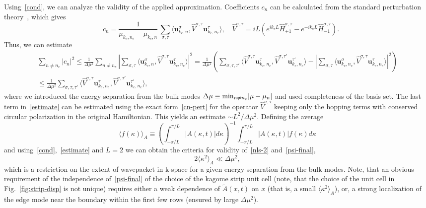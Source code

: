 \documentclass[
aps,
prl,
groupedaddress,
superscriptaddress,
floatfix,
notitlepage
]{revtex4-1}
\begin{document}
Using~\eqref{cond}, we can analyze the validity of the applied approximation. 
Coefficients $c_n$ can be calculated from the standard perturbation theory~\cite{LL-III}, which gives
\begin{equation}
\quad
c_n = \frac{1}{\mu_{k_e,n_e}-\mu_{k_e,n}}\,
\sum_{\sigma,\tau} \langle \pmb{u}^{\sigma}_{k_e,n}, \hat{V}^{\sigma,\tau}
\pmb{u}^{\tau}_{k_e,n_e}
\rangle,
\quad
\hat{V}^{\sigma,\tau} = iL \left(e^{ik_eL} \hat H_{+1}^{\sigma,\tau} - e^{-ik_eL} \hat H_{-1}^{\sigma,\tau}\right).
\label{cn-pert}
\end{equation}
Thus, we can estimate
\begin{multline}
\sum_{n\neq n_e}|c_n|^2 \le \frac{1}{\Delta\mu^2} 
\sum_{n\neq n_e} 
\left|\sum_{\sigma,\tau} \langle \pmb{u}^{\sigma}_{k_e,n}, \hat{V}^{\sigma,\tau}\pmb{u}^{\tau}_{k_e,n_e} \rangle\right|^2
=
\frac{1}{\Delta\mu^2} \left(
\sum_{\sigma,\tau,\tau'} 
\langle \hat{V}^{\sigma,\tau}\pmb{u}^{\tau}_{k_e,n_e} , \hat{V}^{\sigma,\tau'}\pmb{u}^{\tau'}_{k_e,n_e}\rangle
- \left| \sum_{\sigma,\tau} \langle \pmb{u}^{\sigma}_{k_e,n_e}, \hat{V}^{\sigma,\tau}\pmb{u}^{\tau}_{k_e,n_e} \rangle \right|^2
\right) 
\\
\le \frac{1}{\Delta\mu^2}
\sum_{\sigma,\tau,\tau'} 
\langle \hat{V}^{\sigma,\tau}\pmb{u}^{\tau}_{k_e,n_e} , \hat{V}^{\sigma,\tau'}\pmb{u}^{\tau'}_{k_e,n_e}\rangle,
\label{estimate}
\end{multline}
where we introduced the energy separation from the bulk modes $\Delta\mu\equiv {\rm min}_{n\neq n_e} |\mu-\mu_n|$
and used completeness of the basis set. 
The last term in~\eqref{estimate} can be estimated using the exact form~\eqref{cn-pert} for the operator $\hat{V}^{\sigma,\tau}$ keeping only the hopping terms with conserved circular polarization in the original Hamiltonian.
This yields an estimate $\sim L^2/\Delta\mu^2$.
Defining the average
$$
\langle f(\kappa) \rangle_{A} \equiv \left( \int_{-\pi/L}^{\pi/L} |A(\kappa,t)| d\kappa\right)^{-1} \int_{-\pi/L}^{\pi/L} |A(\kappa,t)| f(\kappa) d\kappa
$$
and using~\eqref{cond},~\eqref{estimate} and $L=2$ we can obtain the criteria for validity of~\eqref{nls-2} and~\eqref{psi-final},
\begin{equation}
2\langle \kappa^2 \rangle_{A} \ll \Delta\mu^2,
\label{cond-final}
\end{equation}
which is a restriction on the extent of wavepacket in k-space for a given energy separation from the bulk modes.
Note, that an obvious requirement of the independence of~\eqref{psi-final} of the choice of the kagome strip unit cell (note, that the choice of the unit cell in Fig.~\ref{fig:strip-disp} is not unique) requires either a weak dependence of $\tilde{A}(x,t)$ on $x$ (that is, a small $\langle \kappa^2 \rangle_{A}$), or, a strong localization of the edge mode 
near the boundary within the first few rows (ensured by large $\Delta\mu^2$).
\end{document}
